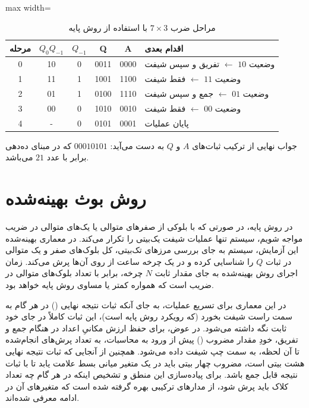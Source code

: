 \documentclass[11pt,a4paper]{article}
\begin{document}
\begin{table}[H]
    \centering
    \begin{adjustbox}{max width=\textwidth}
    \begin{tabular}{|c|c|c|c|c|l|}
        \hline
        \textbf{مرحله} & \textbf{$Q_0 Q_{-1}$} & \textbf{$Q_{-1}$} & \textbf{Q} & \textbf{A} & \textbf{اقدام بعدی} \\
        \hline
        0 & 10 & 0 & 0011 & 0000 & وضعیت $10$ $\leftarrow$ تفریق و سپس شیفت \\
        \hline
        1 & 11 & 1 & 1001 & 1100 & وضعیت $11$ $\leftarrow$ فقط شیفت \\
        \hline
        2 & 01 & 1 & 0100 & 1110 & وضعیت $01$ $\leftarrow$ جمع و سپس شیفت \\
        \hline
        3 & 00 & 0 & 1010 & 0010 & وضعیت $00$ $\leftarrow$ فقط شیفت \\
        \hline
        4 & - & 0 & 0101 & 0001 & پایان عملیات \\
        \hline
    \end{tabular}
    \end{adjustbox}
    \caption{مراحل ضرب $7 \times 3$ با استفاده از روش پایه}
\end{table}
جواب نهایی از ترکیب ثبات‌های $A$ و $Q$ به دست می‌آید: $00010101$ که در مبنای ده‌دهی برابر با عدد $21$ می‌باشد.

\newpage
\section{روش بوث بهینه‌شده}
در روش پایه، در صورتی که با بلوکی از صفرهای متوالی یا یک‌های متوالی در ضریب مواجه شویم، سیستم تنها عملیات شیفت یک‌بیتی را تکرار می‌کند. در معماری بهینه‌شده این آزمایش، سیستم به جای بررسی مرزهای تک‌بیتی، کل بلوک‌های صفر و یک متوالی در ثبات $Q$ را شناسایی کرده و در یک چرخه ساعت از روی آن‌ها پرش می‌کند. زمان اجرای روش بهینه‌شده به جای مقدار ثابت $N$ چرخه، برابر با تعداد بلوک‌های متوالی در ضریب است که همواره کمتر یا مساوی روش پایه خواهد بود.

در این معماری برای تسریع عملیات، به جای آنکه ثبات نتیجه نهایی () در هر گام به سمت راست شیفت بخورد (که رویکرد روش پایه است)، این ثبات کاملاً در جای خود ثابت نگه داشته می‌شود. در عوض، برای حفظ ارزش مکانیِ اعداد در هنگام جمع و تفریق، خودِ مقدار مضروب () پیش از ورود به محاسبات، به تعداد پرش‌های انجام‌شده تا آن لحظه، به سمت چپ شیفت داده می‌شود. همچنین از آنجایی که ثبات نتیجه نهایی هشت بیتی است، مضروب چهار بیتی باید در یک متغیر میانی بسط علامت یابد تا با ثبات نتیجه قابل جمع باشد. برای پیاده‌سازی این منطق و تشخیص اینکه در هر گام چه تعداد کلاک باید پرش شود، از مدارهای ترکیبی بهره گرفته شده است که متغیرهای آن در ادامه معرفی شده‌اند.
\end{document}
